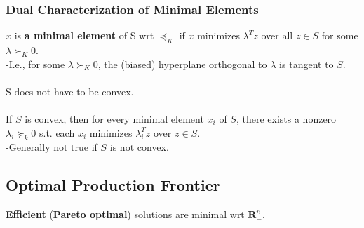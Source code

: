 \documentclass[]{article}
\begin{document}
\subsubsection*{Dual Characterization of Minimal Elements}
$x$ is \textbf{a minimal element} of S wrt $\preceq_{K}$ if $x$ minimizes $\lambda^{T}z$ over all $z \in S$ for some $\lambda \succ_{K} 0$. 
\\
-I.e., for some $\lambda \succ_{K} 0$, the (biased) hyperplane orthogonal to $\lambda$ is tangent to $S$. 
\\\\
S does not have to be convex.
\\\\
If $S$ is convex, then for every minimal element $x_{i}$ of $S$, there exists a nonzero $\lambda_{i} \succeq_{k} 0$ s.t. each $x_{i}$ minimizes $\lambda_{i}^{T}z$ over $z \in S.$
\\
-Generally not true if $S$ is not convex.
\\
\subsection*{Optimal Production Frontier}
\textbf{Efficient} (\textbf{Pareto optimal}) solutions are minimal wrt $\boldsymbol{R}^{n}_{+}$.
\end{document}
